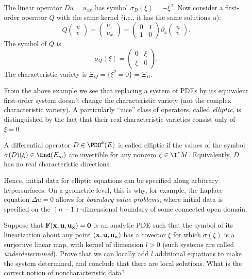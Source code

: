 \begin{example}
    The linear operator $Du=u_{xx}$ has symbol $\sigma_D(\xi)=-\xi^2$. Now consider a first-order operator $Q$ with the same kernel (i.e., it has the same solutions $u$):
    \[Q\begin{pmatrix}
        u\\v
    \end{pmatrix}=
    \begin{pmatrix}
        v_x\\u_x
    \end{pmatrix}=
    \begin{pmatrix}
        0& 1\\1&0
    \end{pmatrix}
    \partial_x
    \begin{pmatrix}
        u\\v
    \end{pmatrix}.
    \]
    The symbol of $Q$ is 
    \[\sigma_Q(\xi)=\begin{pmatrix}
        0&\xi\\\xi&0
    \end{pmatrix}.\]
    The characteristic variety is $\Xi_Q=\{\xi^2=0\}=\Xi_D$.
\end{example}

From the above example we see that replacing a system of PDEs by its equivalent first-order system doesn't change the characteristic variety (not the complex characteristic variety). A particularly ``nice'' class of operators, called \emph{elliptic}, is distinguished by the fact that their real characteristic varieties consist only of $\xi=0$.

\begin{defn}
    A differential operator $D\in\PDO^k(E)$ is called elliptic if the values of the symbol $\sigma(D)(\xi)\in\End(E_m)$ are invertible for any nonzero $\xi\in \T^\ast M$. Equivalently, $D$ has no real characteristic directions.
\end{defn}

Hence, initial data for elliptic equations can be specified along arbitrary hypersurfaces. On a geometric level, this is why, for example, the Laplace equation $\Delta u=0$ allows for \emph{boundary value problems}, where initial data is specified on the $(n-1)$-dimensional boundary of some connected open domain.


\begin{xca}
    Suppose that $\bf{F}(\bf{x},\bf{u},\bf{u}_{\bf x})=0$ is an analytic PDE such that the symbol of its linearization about any point $(\bf{x},\bf{u},\bf{u}_{\bf{x}})$ has a covector $\xi$ for which $\sigma(\xi)$ is a surjective linear map, with kernel of dimension $l>0$ (such systems are called \emph{underdetermined}). Prove that we can locally add $l$ additional equations to make the system determined, and conclude that there are local solutions. What is the correct notion of noncharacteristic data?
\end{xca}


